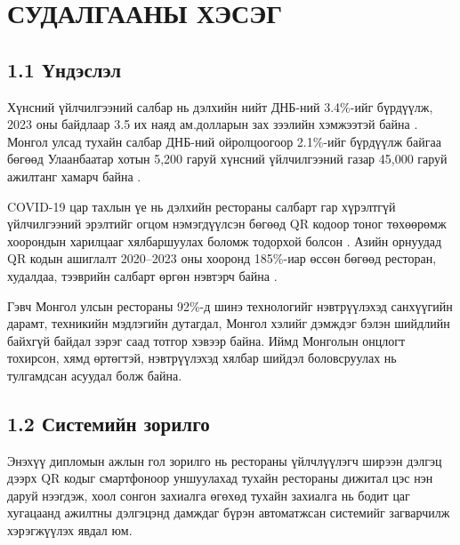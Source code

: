 \chapter{СУДАЛГААНЫ ХЭСЭГ}
\label{Chapter1}
\pagecolor{white}

\newcommand{\keyword}[1]{\textbf{#1}}
\newcommand{\tabhead}[1]{\textbf{#1}}
\newcommand{\code}[1]{\texttt{#1}}

\section{1.1 Үндэслэл}

Хүнсний үйлчилгээний салбар нь дэлхийн нийт ДНБ-ний 3.4\%-ийг бүрдүүлж, 2023 оны
байдлаар 3.5 их наяд ам.долларын зах зээлийн хэмжээтэй байна \cite{statista2023}.
Монгол улсад тухайн салбар ДНБ-ний ойролцоогоор 2.1\%-ийг бүрдүүлж байгаа бөгөөд
Улаанбаатар хотын 5,200 гаруй хүнсний үйлчилгээний газар 45,000 гаруй ажилтанг
хамарч байна \cite{mrhba2023}.

COVID-19 цар тахлын үе нь дэлхийн рестораны салбарт гар хүрэлтгүй үйлчилгээний
эрэлтийг огцом нэмэгдүүлсэн бөгөөд QR кодоор тоног төхөөрөмж хоорондын харилцааг
хялбаршуулах боломж тодорхой болсон \cite{gossling2022}. Азийн орнуудад QR кодын
ашиглалт 2020--2023 оны хооронд 185\%-иар өссөн бөгөөд ресторан, худалдаа,
тээврийн салбарт өргөн нэвтэрч байна \cite{juniper2023}.

Гэвч Монгол улсын рестораны 92\%-д шинэ технологийг нэвтрүүлэхэд санхүүгийн
дарамт, техникийн мэдлэгийн дутагдал, Монгол хэлийг дэмждэг бэлэн шийдлийн
байхгүй байдал зэрэг саад тотгор хэвээр байна. Иймд Монголын онцлогт тохирсон,
хямд өртөгтэй, нэвтрүүлэхэд хялбар шийдэл боловсруулах нь тулгамдсан асуудал
болж байна.

\section{1.2 Системийн зорилго}

Энэхүү дипломын ажлын гол зорилго нь рестораны үйлчлүүлэгч ширээн дэлгэц дээрх
QR кодыг смартфоноор уншуулахад тухайн рестораны дижитал цэс нэн даруй нээгдэж,
хоол сонгон захиалга өгөхөд тухайн захиалга нь бодит цаг хугацаанд ажилтны
дэлгэцэнд дамждаг бүрэн автоматжсан системийг загварчилж хэрэгжүүлэх явдал юм.

